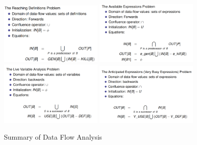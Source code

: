 \documentclass{article}
\begin{document}
\begin{figure}[h]
    \centering
    \includegraphics[width=0.45\textwidth]{Images/summary1.png}
    \includegraphics[width=0.45\textwidth]{Images/summary2.png}
    \includegraphics[width=0.45\textwidth]{Images/summary3.png}
    \includegraphics[width=0.45\textwidth]{Images/summary4.png}
    \caption{Summary of Data Flow Analysis}
    \label{fig:AnticipatedExpressions}
\end{figure}
\end{document}
